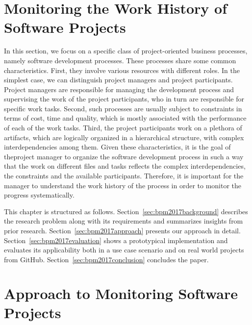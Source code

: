 \section{Monitoring the Work History of Software Projects}


In this section, we focus on a specific class of project-oriented business processes,
namely software development processes. These processes share some common
characteristics. First, they involve various resources with different roles. In the
simplest case, we can distinguish project managers and project participants.
Project managers are responsible for managing the development process and
supervising the work of the project participants, who in turn are responsible for
specific work tasks. Second, such processes are usually subject to constraints in
terms of cost, time and quality, which is mostly associated with the performance
of each of the work tasks. Third, the project participants work on a plethora of
artifacts, which are logically organized in a hierarchical structure, with complex
interdependencies among them. Given these characteristics, it is the goal of theproject manager to organize the software development process in such a way
that the work on different files and tasks reflects the complex interdependencies,
the constraints and the available participants. Therefore, it is important for the
manager to understand the work history of the process in order to monitor the
progress systematically.

This chapter is structured as follows. Section~\ref{sec:bpm2017background} describes the research problem along with its requirements and summarizes insights from prior research. Section~\ref{sec:bpm2017approach} presents our approach in detail. Section~\ref{sec:bpm2017evaluation} shows a prototypical implementation and evaluates its applicability both in a use case scenario and on real world projects from GitHub. Section~\ref{sec:bpm2017conclusion} concludes the paper.

\section{Approach to Monitoring Software Projects}








